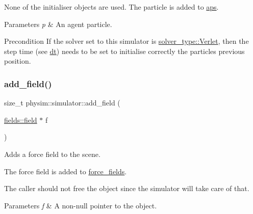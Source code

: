 None of the initialiser objects are used. The particle is added to \hyperlink{classphysim_1_1simulator_a838f036ef9d378d1e3f5207c3f031b52}{aps}.


\begin{DoxyParams}{Parameters}
{\em p} & An agent particle. \\
\hline
\end{DoxyParams}
\begin{DoxyPrecond}{Precondition}
If the solver set to this simulator is \hyperlink{namespacephysim_a09adeda29c09e651877e880d31fc9686ac1f9df543f33d8a79fb2437c853f09b9}{solver\+\_\+type\+::\+Verlet}, then the step time (see \hyperlink{classphysim_1_1simulator_a12a60d0ed819937b51ce50162dbdd6e1}{dt}) needs to be set to initialise correctly the particle\textquotesingle{}s previous position. 
\end{DoxyPrecond}
\mbox{\label{classphysim_1_1simulator_afb7ded1049ec82f7ea8d908c5cefaff7}} 
\subsubsection{\texorpdfstring{add\+\_\+field()}{add\_field()}}
{\footnotesize\ttfamily size\+\_\+t physim\+::simulator\+::add\+\_\+field (\begin{DoxyParamCaption}\item[{\hyperlink{classphysim_1_1fields_1_1field}{fields\+::field} $\ast$}]{f }\end{DoxyParamCaption})}



Adds a force field to the scene. 

The force field is added to \hyperlink{classphysim_1_1simulator_a7e4d709f4b43199405be83eded074816}{force\+\_\+fields}.

The caller should not free the object since the simulator will take care of that. 
\begin{DoxyParams}{Parameters}
{\em f} & A non-\/null pointer to the object. \\
\hline
\end{DoxyParams}
\mbox{\label{classphysim_1_1simulator_a0b65d437e6e32a851251cfab5d184382}} 
